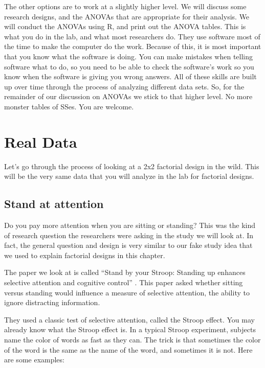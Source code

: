 \documentclass[]{book}
\begin{document}
The other options are to work at a slightly higher level. We will discuss some research designs, and the ANOVAs that are appropriate for their analysis. We will conduct the ANOVAs using R, and print out the ANOVA tables. This is what you do in the lab, and what most researchers do. They use software most of the time to make the computer do the work. Because of this, it is most important that you know what the software is doing. You can make mistakes when telling software what to do, so you need to be able to check the software's work so you know when the software is giving you wrong answers. All of these skills are built up over time through the process of analyzing different data sets. So, for the remainder of our discussion on ANOVAs we stick to that higher level. No more monster tables of SSes. You are welcome.

\hypertarget{real-data}{%
\section{Real Data}\label{real-data}}

Let's go through the process of looking at a 2x2 factorial design in the wild. This will be the very same data that you will analyze in the lab for factorial designs.

\hypertarget{stand-at-attention}{%
\subsection{Stand at attention}\label{stand-at-attention}}

Do you pay more attention when you are sitting or standing? This was the kind of research question the researchers were asking in the study we will look at. In fact, the general question and design is very similar to our fake study idea that we used to explain factorial designs in this chapter.

The paper we look at is called ``Stand by your Stroop: Standing up enhances selective attention and cognitive control'' \citep{rosenbaum2017stand}. This paper asked whether sitting versus standing would influence a measure of selective attention, the ability to ignore distracting information.

They used a classic test of selective attention, called the Stroop effect. You may already know what the Stroop effect is. In a typical Stroop experiment, subjects name the color of words as fast as they can. The trick is that sometimes the color of the word is the same as the name of the word, and sometimes it is not. Here are some examples:
\end{document}
